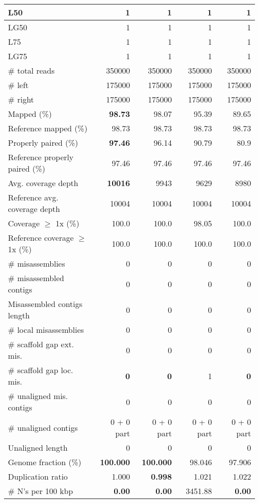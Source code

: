\documentclass[12pt,a4paper]{article}
\begin{document}
\begin{table}[ht]
\begin{center}
\begin{tabular}{|l*{4}{|r}|}
L50 & 1 & 1 & 1 & 1 \\ \hline
LG50 & 1 & 1 & 1 & 1 \\ \hline
L75 & 1 & 1 & 1 & 1 \\ \hline
LG75 & 1 & 1 & 1 & 1 \\ \hline
\# total reads & 350000 & 350000 & 350000 & 350000 \\ \hline
\# left & 175000 & 175000 & 175000 & 175000 \\ \hline
\# right & 175000 & 175000 & 175000 & 175000 \\ \hline
Mapped (\%) & {\bf 98.73} & 98.07 & 95.39 & 89.65 \\ \hline
Reference mapped (\%) & 98.73 & 98.73 & 98.73 & 98.73 \\ \hline
Properly paired (\%) & {\bf 97.46} & 96.14 & 90.79 & 80.9 \\ \hline
Reference properly paired (\%) & 97.46 & 97.46 & 97.46 & 97.46 \\ \hline
Avg. coverage depth & {\bf 10016} & 9943 & 9629 & 8980 \\ \hline
Reference avg. coverage depth & 10004 & 10004 & 10004 & 10004 \\ \hline
Coverage $\geq$ 1x (\%) & 100.0 & 100.0 & 98.05 & 100.0 \\ \hline
Reference coverage $\geq$ 1x (\%) & 100.0 & 100.0 & 100.0 & 100.0 \\ \hline
\# misassemblies & 0 & 0 & 0 & 0 \\ \hline
\# misassembled contigs & 0 & 0 & 0 & 0 \\ \hline
Misassembled contigs length & 0 & 0 & 0 & 0 \\ \hline
\# local misassemblies & 0 & 0 & 0 & 0 \\ \hline
\# scaffold gap ext. mis. & 0 & 0 & 0 & 0 \\ \hline
\# scaffold gap loc. mis. & {\bf 0} & {\bf 0} & 1 & {\bf 0} \\ \hline
\# unaligned mis. contigs & 0 & 0 & 0 & 0 \\ \hline
\# unaligned contigs & 0 + 0 part & 0 + 0 part & 0 + 0 part & 0 + 0 part \\ \hline
Unaligned length & 0 & 0 & 0 & 0 \\ \hline
Genome fraction (\%) & {\bf 100.000} & {\bf 100.000} & 98.046 & 97.906 \\ \hline
Duplication ratio & 1.000 & {\bf 0.998} & 1.021 & 1.022 \\ \hline
\# N's per 100 kbp & {\bf 0.00} & {\bf 0.00} & 3451.88 & {\bf 0.00} \\ \hline

\end{tabular}
\end{center}
\end{table}
\end{document}
